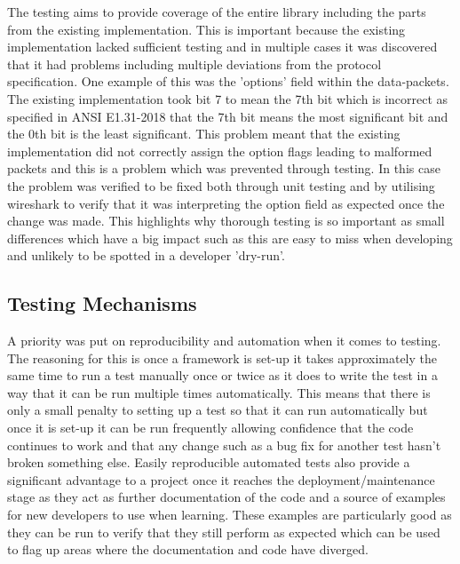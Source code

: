 \documentclass[11pt,a4paper]{article}
\begin{document}
The testing aims to provide coverage of the entire library including the parts from the existing implementation. This is important because the existing implementation lacked sufficient testing and in multiple cases it was discovered that it had problems including multiple deviations from the protocol specification. One example of this was the 'options' field within the data-packets. The existing implementation took bit 7 to mean the 7th bit which is incorrect as specified in ANSI E1.31-2018 that the 7th bit means the most significant bit and the 0th bit is the least significant. This problem meant that the existing implementation did not correctly assign the option flags leading to malformed packets and this is a problem which was prevented through testing. In this case the problem was verified to be fixed both through unit testing and by utilising wireshark to verify that it was interpreting the option field as expected once the change was made. This highlights why thorough testing is so important as small differences which have a big impact such as this are easy to miss when developing and unlikely to be spotted in a developer 'dry-run'.

\subsection{Testing Mechanisms}
A priority was put on reproducibility and automation when it comes to testing. The reasoning for this is once a framework is set-up it takes approximately the same time to run a test manually once or twice as it does to write the test in a way that it can be run multiple times automatically. This means that there is only a small penalty to setting up a test so that it can run automatically but once it is set-up it can be run frequently allowing confidence that the code continues to work and that any change such as a bug fix for another test hasn't broken something else. Easily reproducible automated tests also provide a significant advantage to a project once it reaches the deployment/maintenance stage as they act as further documentation of the code and a source of examples for new developers to use when learning. These examples are particularly good as they can be run to verify that they still perform as expected which can be used to flag up areas where the documentation and code have diverged.\\
\end{document}
